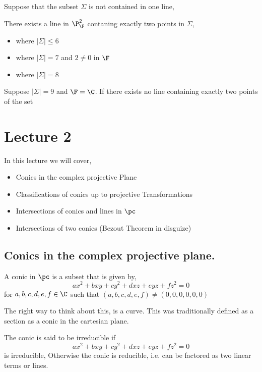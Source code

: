 \documentclass{article}
\begin{document}
Suppose that the subset $\Sigma$ is not contained in one line,

\begin{nlemma}[]
  There exists a line in $\P_\F^2$ contaning exactly two points in $\Sigma$,
  \begin{itemize}
    \item where $|\Sigma| \le 6$
    \item where $|\Sigma| = 7$ and $2 \ne 0$ in $\F$
    \item where $|\Sigma| = 8$
  \end{itemize}
\end{nlemma}

\begin{nthm}[]
  Suppose $|\Sigma| = 9$ and $\F=\C$. If there exists no line containing exactly two points of the set
\end{nthm}

\section{Lecture 2}
In this lecture we will cover,
\begin{itemize}
  \item Conics in the complex projective Plane
  \item Classifications of conics up to projective Transformations
  \item Intersections of conics and lines in $\pc$
  \item Intersections of two conics (Bezout Theorem in disguize)
\end{itemize}

\subsection{Conics in the complex projective plane.}

\begin{ndefi}[Conic]
  A conic in $\pc$ is a subset that is given by,
  $$ ax^2 + bxy + cy^2 + dxz + eyz + fz^2 = 0 $$
  for $a, b, c, d, e, f \in \C$ such that $(a, b, c, d, e, f) \ne (0, 0, 0,0,0,0)$
\end{ndefi}

The right way to think about this, is a curve. This was traditionally defined as a section as a conic in the cartesian plane.

\begin{ndefi}[Irriducible]
  The conic is said to be irreducible if
  $$ ax^2 + bxy + cy^2 + dxz + eyz + fz^2 = 0 $$
  is irreducible, Otherwise the conic is reducible, i.e. can be factored as two linear terms or lines.
\end{ndefi}
\end{document}
